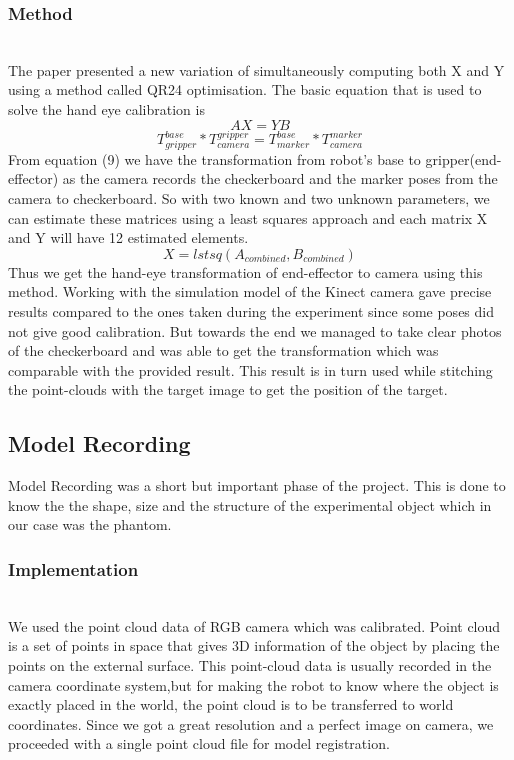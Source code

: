 \subsubsection{Method}~\\
The paper presented a new variation of simultaneously computing both X and Y using a method called QR24 optimisation. The basic equation that is used to solve the hand eye calibration is
\begin{equation}
AX=YB
\end{equation}
\begin{equation}
T_{gripper}^{base} * T_{camera}^{gripper} = T_{marker}^{base} * T_{camera}^{marker}
\end{equation}
From equation (9) we have the transformation from robot's base to gripper(end-effector) as the camera records the checkerboard and the marker poses from the camera to checkerboard. So with two known and two unknown parameters, we can estimate these matrices using a least squares approach and each matrix X and Y will have 12 estimated elements.
\begin{equation}
X = lstsq(A_{combined}, B_{combined})
\end{equation}Thus we get the hand-eye transformation of end-effector to camera using this method.
Working with the simulation model of the Kinect camera gave precise results compared to the ones taken during the experiment since some poses did not give good calibration. But towards the end we managed to take clear photos of the checkerboard and was able to get the transformation which was comparable with the provided result. This result is in turn used while stitching the point-clouds with the target image to get the position of the target.

\subsection{Model Recording}
Model Recording was a short but important phase of the project. This is done to know the the shape, size and the structure of the experimental object which in our case was the phantom.
\subsubsection{Implementation} ~\\
We used the point cloud data of RGB camera which was calibrated. Point cloud is a set of points in space that gives 3D information of the object by placing the points on the external surface. This point-cloud data is usually recorded in the camera coordinate system,but for making the robot to know where the object is exactly placed in the world, the point cloud is to be transferred to world coordinates. Since we got a great resolution and a perfect image on camera, we proceeded with a single point cloud file for model registration.


